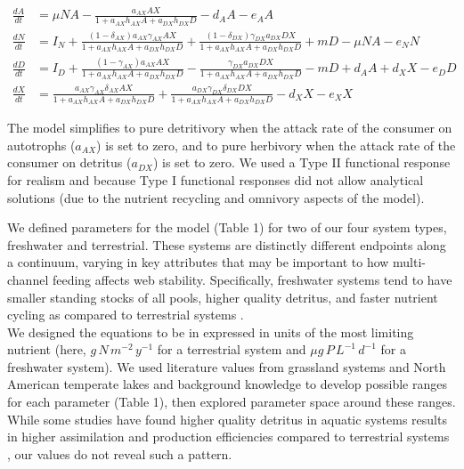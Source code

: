 \documentclass[12pt,a4paper,oneside]{article}
\begin{document}
\\
\begin{small}
\begin{align*}
 \frac{dA}{dt} &=\mu NA- \frac{a_{AX}AX}{1+a_{AX}h_{AX}A+a_{DX}h_{DX}D} - d_{A}A- e_{A}A  
\\[2em]
 \frac{dN}{dt} &= I_{N} +
 \frac{(1-\delta_{AX})a_{AX}\gamma_{AX}AX}{1+a_{AX}h_{AX}A+a_{DX}h_{DX}D}
 +
 \frac{(1-\delta_{DX})\gamma_{DX}a_{DX}DX}{1+a_{AX}h_{AX}A+a_{DX}h_{DX}D}+
 mD -\mu NA- e_{N}N
\\[2em]
 \frac{dD}{dt} &= I_{D} +
 \frac{(1-\gamma_{AX})a_{AX}AX}{1+a_{AX}h_{AX}A+a_{DX}h_{DX}D} -
 \frac{\gamma_{DX}a_{DX}DX}{1+a_{AX}h_{AX}A+a_{DX}h_{DX}D} - mD + d_{A}A +
 d_{X}X - e_{D}D
\\[2em]
 \frac{dX}{dt} &=
 \frac{a_{AX}\gamma_{AX}\delta_{AX}AX}{1+a_{AX}h_{AX}A+a_{DX}h_{DX}D} +
 \frac{a_{DX}\gamma_{DX}\delta_{DX}DX}{1+a_{AX}h_{AX}A+a_{DX}h_{DX}D}- d_{X}X - e_{X}X
\end{align*}
\end{small}

\noindent The model simplifies to pure detritivory when the attack rate
of the consumer on autotrophs (\(a_{AX}\)) is
set to zero, and to pure herbivory when the attack rate
of the consumer on detritus (\(a_{DX}\)) is
set to zero. We used a Type II functional response for realism and because Type I functional responses did not allow analytical solutions (due to the nutrient recycling and omnivory aspects of the model).

\indent We defined parameters for the model (Table 1) for two of our
four system types, freshwater and
terrestrial. These systems are distinctly different endpoints along a
continuum, varying in key attributes that may be important to how
multi-channel feeding affects web stability. Specifically, freshwater systems
tend to have smaller standing stocks of all pools, higher quality
detritus, and faster nutrient cycling as compared to terrestrial
systems \citep{Cebrian:2004}.
\\ 
\indent We designed the equations to be in
expressed in units of the most limiting nutrient (here, \(g\,N\,m^{-2} \,y^{-1}\)
for a terrestrial system and \(\mu g\,P\, L^{-1}\,d^{-1}\) for a freshwater system). We used literature values from grassland
systems and North American temperate lakes and background knowledge to
develop possible ranges for each parameter (Table 1), then explored
parameter space around
these ranges. While some studies have found higher quality detritus in aquatic systems results in higher assimilation and production efficiencies compared to terrestrial systems \citep{Cebrian:2004,Cebrian:2009hg}, our values do not reveal such a pattern. 
\end{document}
